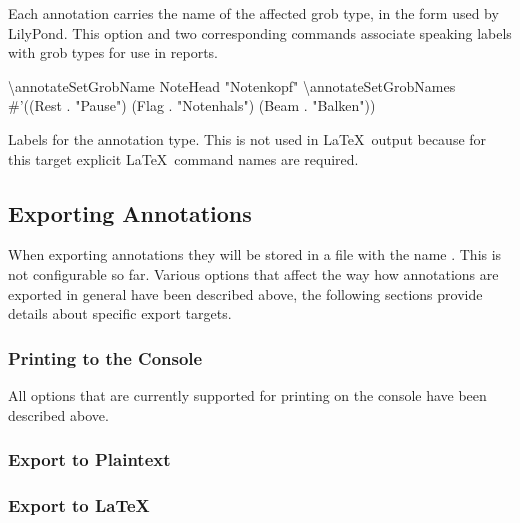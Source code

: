 \documentclass[]{ollmanual}
\newenvironment{Shaded}{}{}
\newcommand{\FloatTok}[1]{\textcolor[rgb]{0.25,0.63,0.44}{#1}}
\newcommand{\FunctionTok}[1]{\textcolor[rgb]{0.02,0.16,0.49}{#1}}
\newcommand{\NormalTok}[1]{#1}
\newcommand{\StringTok}[1]{\textcolor[rgb]{0.25,0.44,0.63}{#1}}
\begin{document}
Each annotation carries the name of the affected grob type, in the form
used by LilyPond. This option and two corresponding commands associate
speaking labels with grob types for use in reports.

\begin{Shaded}
\begin{Highlighting}[]
\FunctionTok{\textbackslash{}annotateSetGrobName}\NormalTok{ NoteHead "}\StringTok{Notenkopf"}
\FunctionTok{\textbackslash{}annotateSetGrobNames}
\NormalTok{#}\FloatTok{'((Rest . "}\StringTok{Pause"}\FloatTok{)}
\FloatTok{   (Flag . "}\StringTok{Notenhals"}\FloatTok{)}
\FloatTok{   (Beam . "}\StringTok{Balken"}\FloatTok{))}
\end{Highlighting}
\end{Shaded}


Labels for the annotation type. This is not used in \LaTeX~output
because for this target explicit \LaTeX~command names are required.

\hypertarget{exporting-annotations}{%
\subsection{Exporting Annotations}\label{exporting-annotations}}

When exporting annotations they will be stored in a file with the name
. This is not
configurable so far. Various options that affect the way how annotations
are exported in general have been described above, the following
sections provide details about specific export targets.

\hypertarget{printing-to-the-console}{%
\subsubsection{Printing to the Console}\label{printing-to-the-console}}

All options that are currently supported for printing on the console
have been described above.

\hypertarget{export-to-plaintext}{%
\subsubsection{Export to Plaintext}\label{export-to-plaintext}}

\hypertarget{export-to}{%
\subsubsection{\texorpdfstring{Export to
\LaTeX}{Export to }}\label{export-to}}
\end{document}
